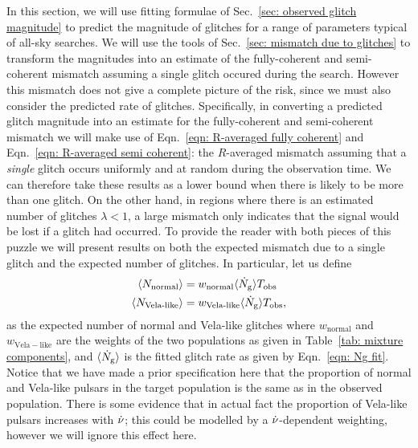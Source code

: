 \documentclass[../full_thesis/full_thesis.tex]{subfiles}
\begin{document}
In this section, we will use fitting formulae of Sec.~\ref{sec: observed glitch
magnitude} to predict the magnitude of glitches for a range of parameters
typical of all-sky searches. We will use the tools of Sec.~\ref{sec: mismatch
due to glitches} to transform the magnitudes into an estimate of the
fully-coherent and semi-coherent mismatch assuming a single glitch occured
during the search. However this mismatch does not give a complete picture of
the risk, since we must also consider the predicted rate of glitches.
Specifically, in converting a predicted glitch magnitude into an estimate for
the fully-coherent and semi-coherent mismatch we will make use of
Eqn.~\eqref{eqn: R-averaged fully coherent} and Eqn.~\eqref{eqn: R-averaged
semi coherent}: the $R$-averaged mismatch assuming that a \emph{single} glitch
occurs uniformly and at random during the observation time. We can therefore
take these results as a lower bound when there is likely to be more than one
glitch. On the other hand, in regions where there is an estimated number of
glitches $\lambda < 1$, a large mismatch only indicates that the signal would
be lost if a glitch had occurred. To provide the reader with both pieces of
this puzzle we will present results on both the expected mismatch due to a
single glitch and the expected number of glitches. In particular, let us define
\begin{align}
\begin{split}
\langle N_{\textrm{normal}} \rangle & = w_\textrm{normal}\langle \dot{N}_{\textrm{g}}\rangle T_{\mathrm{obs}} \\
\langle N_{\textrm{Vela-like}} \rangle & = w_\textrm{Vela-like}\langle \dot{N}_{\textrm{g}}\rangle T_{\mathrm{obs}},
\end{split}
\label{eqn: N}
\end{align}
as the expected number of normal and Vela-like glitches where $w_\mathrm{normal}$
and $w_\mathrm{Vela-like}$ are the weights of the two populations as given in
Table~\ref{tab: mixture components}, and $\langle \dot{N}_{\textrm{g}}\rangle$ is the fitted glitch rate as
given by Eqn.~\eqref{eqn: Ng fit}. Notice that we have made a prior specification
here that the proportion of normal and Vela-like pulsars in the target population
is the same as in the observed population. There is some evidence that in actual
fact the proportion of Vela-like pulsars increases with $\dot{\nu}$; this could
be modelled by a $\dot{\nu}$-dependent weighting, however we will ignore this
effect here.
\end{document}
